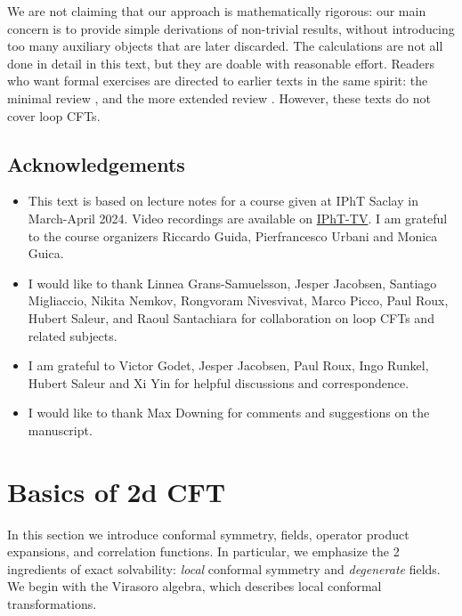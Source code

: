 \documentclass[12pt, a4paper]{article}
\theoremstyle{break}
\begin{document}
We are not claiming that our approach is mathematically rigorous: our main concern is to provide simple derivations of non-trivial results, without introducing too many auxiliary objects that are later discarded. The calculations are not all done in detail in this text, but they are doable with reasonable effort. Readers who want formal exercises are directed to earlier texts in the same spirit: the minimal review \cite{rib16}, and the more extended review \cite{rib14}. However, these texts do not cover loop CFTs.


\subsection*{Acknowledgements}

\begin{itemize}
 \item This text is based on lecture notes for a course given at IPhT Saclay in March-April 2024. Video recordings are available on \href{https://www.youtube.com/playlist?list=PLrLctLPAdPNtD7yFOcfdNx2J-A_CE1svr}{IPhT-TV}. I am grateful to the course organizers Riccardo Guida, Pierfrancesco Urbani and Monica Guica. 
 \item I would like to thank Linnea Grans-Samuelsson, Jesper Jacobsen, Santiago Migliaccio, Nikita Nemkov, Rongvoram Nivesvivat, Marco Picco, Paul Roux, Hubert Saleur, and Raoul Santachiara for collaboration on loop CFTs and related subjects. 
 \item I am grateful to Victor Godet, Jesper Jacobsen, Paul Roux, Ingo Runkel, Hubert Saleur and Xi Yin for helpful discussions and correspondence. 
 \item I would like to thank Max Downing for comments and suggestions on the manuscript. 
\end{itemize}



\section{Basics of 2d CFT}\label{sec:bo}

In this section we introduce conformal symmetry, fields, operator product expansions, and correlation functions. In particular, we emphasize the 2 ingredients of exact solvability: \textit{local} conformal symmetry and \textit{degenerate} fields. We begin with the Virasoro algebra, which describes local conformal transformations. 
\end{document}
